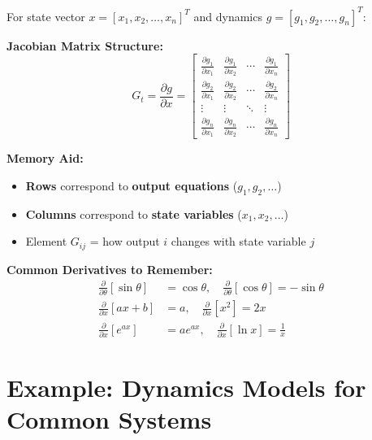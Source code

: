 \begin{tcolorbox}[colback=red!5!white,colframe=red!75!black,title=\textbf{EXAM CRITICAL: Jacobian Structure}]

For state vector $x = [x_1, x_2, \ldots, x_n]^T$ and dynamics $g = [g_1, g_2, \ldots, g_n]^T$:

\vspace{2mm}
\textbf{Jacobian Matrix Structure:}
\begin{equation}
G_t = \frac{\partial g}{\partial x} =
\begin{bmatrix}
\frac{\partial g_1}{\partial x_1} & \frac{\partial g_1}{\partial x_2} & \cdots & \frac{\partial g_1}{\partial x_n} \\[5pt]
\frac{\partial g_2}{\partial x_1} & \frac{\partial g_2}{\partial x_2} & \cdots & \frac{\partial g_2}{\partial x_n} \\[5pt]
\vdots & \vdots & \ddots & \vdots \\[5pt]
\frac{\partial g_n}{\partial x_1} & \frac{\partial g_n}{\partial x_2} & \cdots & \frac{\partial g_n}{\partial x_n}
\end{bmatrix}
\end{equation}

\textbf{Memory Aid:}
\begin{itemize}
    \item \textbf{Rows} correspond to \textbf{output equations} ($g_1, g_2, \ldots$)
    \item \textbf{Columns} correspond to \textbf{state variables} ($x_1, x_2, \ldots$)
    \item Element $G_{ij}$ = how output $i$ changes with state variable $j$
\end{itemize}

\textbf{Common Derivatives to Remember:}
\begin{align*}
\frac{\partial}{\partial \theta}[\sin\theta] &= \cos\theta, \quad \frac{\partial}{\partial \theta}[\cos\theta] = -\sin\theta \\
\frac{\partial}{\partial x}[ax + b] &= a, \quad \frac{\partial}{\partial x}[x^2] = 2x \\
\frac{\partial}{\partial x}[e^{ax}] &= ae^{ax}, \quad \frac{\partial}{\partial x}[\ln x] = \frac{1}{x}
\end{align*}

\end{tcolorbox}

\section{Example: Dynamics Models for Common Systems}

